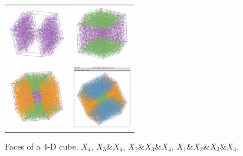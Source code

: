 \begin{figure}[ht]
\centering
\begin{tabular}{c c}
  \includegraphics[width=1in]{fig/cube-4-face-1-1.pdf} & \includegraphics[width=1in]{fig/cube-4-face-2-1.pdf} \\
  \includegraphics[width=1in]{fig/cube-4-face-3-1.pdf} &\includegraphics[width=1in]{fig/cube-4-face-4-1.pdf}
\end{tabular}
\caption{Faces of a 4-D cube, $X_4$, $X_3$\&$X_4$, $X_2$\&$X_3$\&$X_4$,
  $X_1$\&$X_2$\&$X_3$\&$X_4$.}
\label{4faces}
\end{figure}

